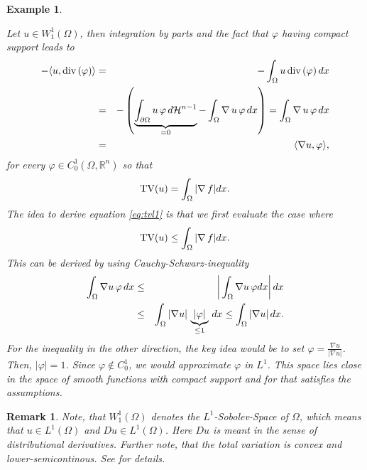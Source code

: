 \documentclass{scrreprt}
\newtheorem{example}[theorem]{Example}
\newtheorem{remark}[theorem]{Remark}
\begin{document}
        \begin{example} %
        \label{prop:u_is_smooth}

            Let $u \in W_{1}^{1}(\Omega)$, then integration by parts and the fact that $\varphi$ having compact support leads to
                \begin{eqnarray}
                    -\langle u, \textnormal{div}\,(\varphi) \rangle &=& - \int_{\Omega} u\, \textnormal{div}\, (\varphi)\, dx \notag \\
                    &=& - \left( \underbrace{\int_{\partial\Omega} u\, \varphi\, d\mathcal{H}^{n-1}}_{= 0} - \int_{\Omega} \nabla\,u\, \varphi\, dx \right) = \int_{\Omega} \nabla\,u\,\varphi\,dx \notag \\
                    &=& \langle \nabla u, \varphi \rangle,
                    \label{eq:nabla_equals_minus_divergence}
                \end{eqnarray}
            for every $\varphi \in C^{1}_{0}(\Omega, \mathbb{R}^{n})$ so that
                \begin{equation}
                    \textnormal{TV}(u) = \int_{\Omega} |\nabla\,f| dx.
                    \label{eq:tvl1}
                \end{equation}
            The idea to derive equation \ref{eq:tvl1} is that we first evaluate the case where
                $$
                    \textnormal{TV}(u) \le \int_{\Omega} |\nabla\,f| dx.
                $$
            This can be derived by using Cauchy-Schwarz-inequality
                \begin{eqnarray}
                    \int_{\Omega} \nabla u \, \varphi \, dx &\le& \bigg| \int_{\Omega} \nabla u \, \varphi dx \bigg| \, dx \notag \\
                    &\le& \int_{\Omega} |\nabla u| \, \underbrace{|\varphi|}_{\le 1} \, dx \le \int_{\Omega} |\nabla u| \, dx. \notag
                \end{eqnarray}
            For the inequality in the other direction, the key idea would be to set $\varphi = \frac{\nabla u}{|\nabla u|}$. Then, $|\varphi| = 1$. Since $\varphi \notin C_{0}^{1}$, we would approximate $\varphi$ in $L^{1}$. This space lies close in the space of smooth functions with compact support and for that satisfies the assumptions.

        \end{example}

        \begin{remark}
            Note, that $W_{1}^{1}(\Omega)$ denotes the $L^{1}$-Sobolev-Space of $\Omega$, which means that $u \in L^{1}(\Omega)$ and $Du \in L^{1}(\Omega)$. Here $Du$ is meant in the sense of distributional derivatives. Further note, that the total variation is convex and lower-semicontinous. See \cite{Chambolle-et-al-10} for details.
        \end{remark}
\end{document}
